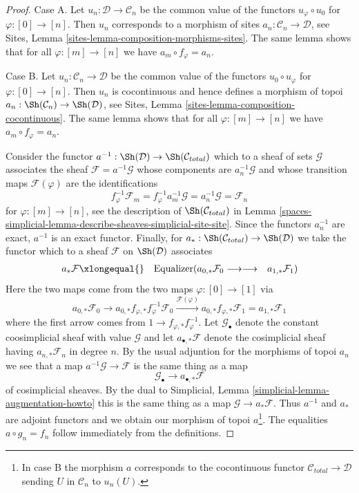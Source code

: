 \begin{proof}
Case A. Let $u_n : \mathcal{D} \to \mathcal{C}_n$ be the common
value of the functors $u_\varphi \circ u_0$ for $\varphi : [0] \to [n]$.
Then $u_n$ corresponds to a morphism of sites
$a_n : \mathcal{C}_n \to \mathcal{D}$, see
Sites, Lemma \ref{sites-lemma-composition-morphisms-sites}.
The same lemma shows that for all $\varphi : [m] \to [n]$ we have
$a_m \circ f_\varphi = a_n$.

\medskip\noindent
Case B. Let $u_n : \mathcal{C}_n \to \mathcal{D}$ be the common
value of the functors $u_0 \circ u_\varphi$ for $\varphi : [0] \to [n]$.
Then $u_n$ is cocontinuous and hence defines a morphism of topoi
$a_n : \Sh(\mathcal{C}_n) \to \Sh(\mathcal{D)}$, see
Sites, Lemma \ref{sites-lemma-composition-cocontinuous}.
The same lemma shows that for all $\varphi : [m] \to [n]$ we have
$a_m \circ f_\varphi = a_n$.

\medskip\noindent
Consider the functor $a^{-1} : \Sh(\mathcal{D}) \to \Sh(\mathcal{C}_{total})$
which to a sheaf of sets $\mathcal{G}$ associates the sheaf
$\mathcal{F} = a^{-1}\mathcal{G}$ whose components are $a_n^{-1}\mathcal{G}$
and whose transition maps $\mathcal{F}(\varphi)$ are the identifications
$$
f_\varphi^{-1}\mathcal{F}_m =
f_\varphi^{-1} a_m^{-1}\mathcal{G} =
a_n^{-1}\mathcal{G} =
\mathcal{F}_n
$$
for $\varphi : [m] \to [n]$, see the description of
$\Sh(\mathcal{C}_{total})$ in
Lemma \ref{spaces-simplicial-lemma-describe-sheaves-simplicial-site-site}.
Since the functors $a_n^{-1}$ are exact, $a^{-1}$ is an exact functor.
Finally, for $a_* : \Sh(\mathcal{C}_{total}) \to \Sh(\mathcal{D})$
we take the functor which to a sheaf $\mathcal{F}$ on $\Sh(\mathcal{D})$
associates
$$
\begin{array}{ccc}a_*\mathcal{F} \xlongequal{} & \text{Equalizer}(a_{0, *}\mathcal{F}_0
\longrightarrow\longrightarrow & a_{1, *}\mathcal{F}_1)\end{array}
$$
Here the two maps come from the two maps $\varphi : [0] \to [1]$
via
$$
a_{0, *}\mathcal{F}_0 \to
a_{0, *}f_{\varphi, *} f_\varphi^{-1}\mathcal{F}_0
\xrightarrow{\mathcal{F}(\varphi)}
a_{0, *}f_{\varphi, *} \mathcal{F}_1 = a_{1, *}\mathcal{F}_1
$$
where the first arrow comes from $1 \to f_{\varphi, *} f_\varphi^{-1}$.
Let $\mathcal{G}_\bullet$ denote the constant coosimplicial sheaf
with value $\mathcal{G}$ and let $a_{\bullet, *}\mathcal{F}$
denote the cosimplicial sheaf having $a_{n, *}\mathcal{F}_n$ in degree $n$.
By the usual adjuntion for the morphisms of topoi $a_n$ we see that
a map $a^{-1}\mathcal{G} \to \mathcal{F}$
is the same thing as a map
$$
\mathcal{G}_\bullet \longrightarrow a_{\bullet, *}\mathcal{F}
$$
of cosimplicial sheaves.
By the dual to Simplicial, Lemma \ref{simplicial-lemma-augmentation-howto}
this is the same thing as a map $\mathcal{G} \to a_*\mathcal{F}$.
Thus $a^{-1}$ and $a_*$ are adjoint functors and we obtain
our morphism of topoi $a$\footnote{In case B the morphism $a$
corresponds to the cocontinuous functor
$\mathcal{C}_{total} \to \mathcal{D}$ sending
$U$ in $\mathcal{C}_n$ to $u_n(U)$.}. The equalities
$a \circ g_n = f_n$ follow immediately from the definitions.
\end{proof}

